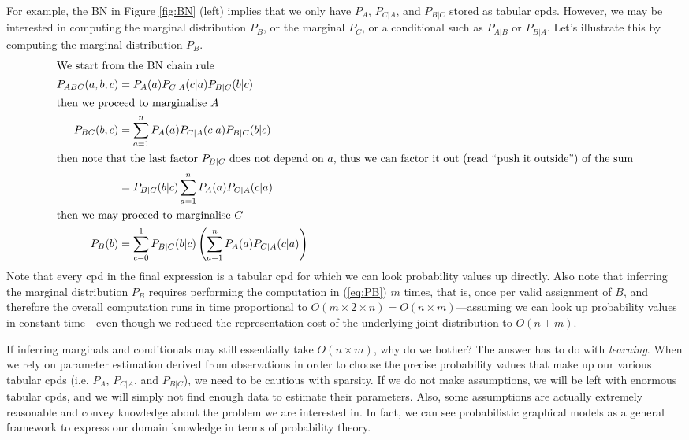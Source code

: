 For example, the BN in Figure \ref{fig:BN} (left) implies that we only have $P_A$, $P_{C|A}$, and $P_{B|C}$ stored as tabular cpds. However, we may be interested in computing the marginal distribution $P_B$, or the marginal $P_C$, or a conditional such as $P_{A|B}$ or $P_{B|A}$.
Let's illustrate this by computing the marginal distribution $P_B$.
\begin{subequations}
\begin{align}
\intertext{We start from the BN chain rule}
P_{ABC}(a,b,c) &= P_A(a)P_{C|A}(c|a)P_{B|C}(b|c) \\
\intertext{then we proceed to marginalise $A$}
P_{BC}(b,c) &= \sum_{a=1}^n P_A(a)P_{C|A}(c|a)P_{B|C}(b|c) \\
\intertext{then note that the last factor $P_{B|C}$ does not depend on $a$, thus we can factor it out (read ``push it outside'') of the sum}
 &= P_{B|C}(b|c) \sum_{a=1}^n P_A(a)P_{C|A}(c|a) \\
\intertext{then we may proceed to marginalise $C$}
P_B(b) &= \sum_{c=0}^1 P_{B|C}(b|c) \left(\sum_{a=1}^n P_A(a)P_{C|A}(c|a) \right) \label{eq:PB}
\end{align}
\end{subequations}
Note that every cpd in the final expression is a tabular cpd for which we can look probability values up directly.
Also note that inferring the marginal distribution $P_B$ requires performing the computation in (\ref{eq:PB}) $m$ times, that is, once per valid assignment of $B$, and therefore the overall computation runs in time proportional to $O(m \times 2 \times n) = O(n \times m)$---assuming we can look up probability values in constant time---even though we reduced the representation cost of the underlying joint distribution to $O(n+m)$.

If inferring marginals and conditionals may still essentially take $O(n \times m)$, why do we bother? 
The answer has to do with \emph{learning}. 
When we rely on parameter estimation derived from observations in order to choose the precise probability values that make up our various tabular cpds (i.e. $P_A$, $P_{C|A}$, and $P_{B|C}$), we need to be cautious with sparsity.
If we do not make assumptions, we will be left with enormous tabular cpds, and we will simply not find enough data to estimate their parameters.
Also, some assumptions are actually extremely reasonable and convey knowledge about the problem we are interested in. 
In fact, we can see probabilistic graphical models as a general framework to express our domain knowledge in terms of probability theory.


